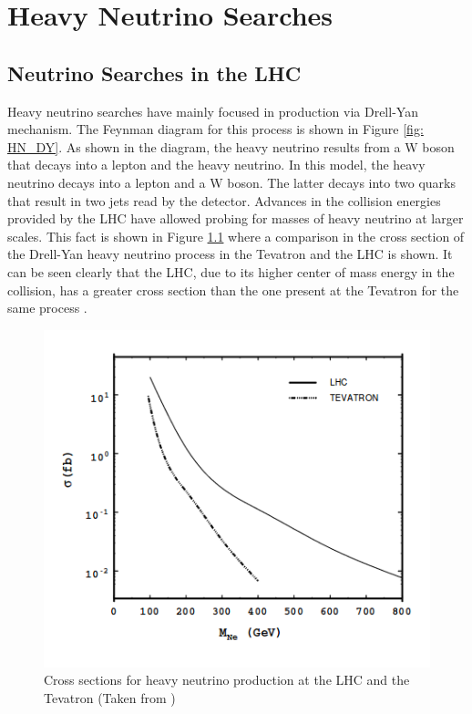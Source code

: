 \graphicspath{{NeutrinoSearches/Figures/}}

\chapter{Heavy Neutrino Searches}

\section{Neutrino Searches in the LHC}

Heavy neutrino searches have mainly focused in production via Drell-Yan mechanism. The Feynman diagram for this process is shown in Figure \ref{fig: HN_DY}. As shown in the diagram, the heavy neutrino results from  a W boson that decays into a lepton and the heavy neutrino. In this model, the heavy neutrino decays into a lepton and a W boson. The latter decays into two quarks that result in two jets read by the detector. Advances in the collision energies provided by the LHC have allowed probing for masses of heavy neutrino at larger scales. This fact is shown in Figure \ref{fig: LHCvsTevatron} where a comparison in the cross section of the Drell-Yan heavy neutrino process in the Tevatron and the LHC is shown. It can be seen clearly that the LHC, due to its higher center of mass energy in the collision, has a greater cross section than the one present at the Tevatron for the same process \cite{Tevatron}.


\begin{figure}[H]
\centering
\includegraphics[width=\linewidth]{LHCvsTevatron}
\caption{Cross sections for heavy neutrino production at the LHC and the Tevatron (Taken from \cite{Tevatron})}
\label{fig: LHCvsTevatron}
\end{figure}


